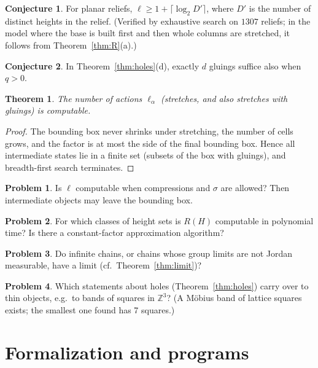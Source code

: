 \documentclass[11pt,a4paper]{article}
\theoremstyle{plain}
\newtheorem{theorem}{Theorem}
\theoremstyle{definition}
\newtheorem{conjecture}{Conjecture}
\newtheorem{problem}{Problem}
\theoremstyle{remark}
\newcommand{\Z}{\mathbb{Z}}
\begin{document}
\begin{conjecture}
For planar reliefs, $\ell\ge1+\lceil\log_2 D'\rceil$, where $D'$ is the number of distinct heights in the relief. (Verified by exhaustive search on $1307$ reliefs; in the model where the base is built first and then whole columns are stretched, it follows from Theorem~\ref{thm:R}(a).)
\end{conjecture}

\begin{conjecture}
In Theorem~\ref{thm:holes}(d), exactly $d$ gluings suffice also when $q>0$.
\end{conjecture}

\begin{theorem}\label{thm:dec}
The number of actions $\ell_\alpha$ (stretches, and also stretches with gluings) is computable.
\end{theorem}
\begin{proof}
The bounding box never shrinks under stretching, the number of cells grows, and the factor is at most the side of the final bounding box. Hence all intermediate states lie in a finite set (subsets of the box with gluings), and breadth-first search terminates.
\end{proof}

\begin{problem}
Is $\ell$ computable when compressions and $\sigma$ are allowed? Then intermediate objects may leave the bounding box.
\end{problem}

\begin{problem}
For which classes of height sets is $R(H)$ computable in polynomial time? Is there a constant-factor approximation algorithm?
\end{problem}

\begin{problem}\label{pr:limit}
Do infinite chains, or chains whose group limits are not Jordan measurable, have a limit (cf.\ Theorem~\ref{thm:limit})?
\end{problem}

\begin{problem}
Which statements about holes (Theorem~\ref{thm:holes}) carry over to thin objects, e.g.\ to bands of squares in $\Z^3$? (A Möbius band of lattice squares exists; the smallest one found has 7 squares.)
\end{problem}

\section{Formalization and programs}\label{sec:formal}
\end{document}

